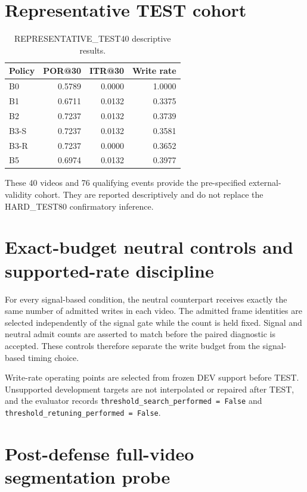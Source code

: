 \documentclass[10pt,twocolumn,letterpaper]{article}
\begin{document}
\section{Representative TEST cohort}
\label{sec:supp-representative}

\begin{table}[t]
\centering
\small
\caption{REPRESENTATIVE\_TEST40 descriptive results.}
\label{tab:supp-representative}
\begin{tabular}{lrrr}
\toprule
Policy & POR@30 & ITR@30 & Write rate \\
\midrule
B0   & 0.5789 & 0.0000 & 1.0000 \\
B1   & 0.6711 & 0.0132 & 0.3375 \\
B2   & 0.7237 & 0.0132 & 0.3739 \\
B3-S & 0.7237 & 0.0132 & 0.3581 \\
B3-R & 0.7237 & 0.0000 & 0.3652 \\
B5   & 0.6974 & 0.0132 & 0.3977 \\
\bottomrule
\end{tabular}
\end{table}

These 40 videos and 76 qualifying events provide the pre-specified
external-validity cohort.  They are reported descriptively and do not replace
the HARD\_TEST80 confirmatory inference.

\section{Exact-budget neutral controls and supported-rate discipline}
\label{sec:supp-rate-controls}

For every signal-based condition, the neutral counterpart receives exactly
the same number of admitted writes in each video.  The admitted frame
identities are selected independently of the signal gate while the count is
held fixed.  Signal and neutral admit counts are asserted to match before the
paired diagnostic is accepted.  These controls therefore separate the write
budget from the signal-based timing choice.

Write-rate operating points are selected from frozen DEV support before
TEST.  Unsupported development targets are not interpolated or repaired
after TEST, and the evaluator records
\texttt{threshold\_search\_performed = False} and
\texttt{threshold\_retuning\_performed = False}.

\section{Post-defense full-video segmentation probe}
\label{sec:supp-exp055}
\end{document}
